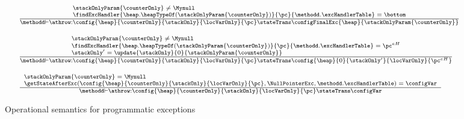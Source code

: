  \begin{figure}[ht!] 
\begin{frameit}
 $$ \begin{array}{l}
 {\scriptsize \frac{ 
	             \begin{array}{l}	 
		           \stackOnlyParam{\counterOnly} \neq \Mynull   \\
			   \findExcHandler{\heap.\heapTypeOf(  \stackOnlyParam{\counterOnly} )  }{\pc}{\methodd.\excHandlerTable} = \bottom 
		     \end{array}	     
	      }
              {\methodd \vdash \athrow :  \config{\heap}{\counterOnly}{\stackOnly}{\locVarOnly}{\pc} 
		                         \stateTrans  
					\configFinalExc{\heap }{\stackOnlyParam{\counterOnly} }} } \\ \\ 
{\scriptsize \frac{ \begin{array}{l}	 
		                \stackOnlyParam{\counterOnly} \neq \Mynull   \\
				\findExcHandler{\heap.\heapTypeOf(  \stackOnlyParam{\counterOnly} )  }{\pc}{\methodd.\excHandlerTable} = \pc^{eH} \\
				\stackOnly' = \update{\stackOnly}{0}{ \stackOnlyParam{\counterOnly} } \\
			    \end{array}	     
	      }
              {\methodd \vdash \athrow :  \config{\heap}{\counterOnly}{\stackOnly}{\locVarOnly}{\pc} 
		                          \stateTrans  
					   \config{\heap}{0}{\stackOnly'}{\locVarOnly}{\pc^{eH}}  } } \\ \\ 
 {\scriptsize \frac{ \begin{array}{l}	 
	                     \stackOnlyParam{\counterOnly}  = \Mynull   \\
			     \getStateAfterExc( \config{\heap}{\counterOnly}{\stackOnly}{\locVarOnly}{\pc}, \NullPointerExc  ,\methodd.\excHandlerTable ) =  \configVar
      		    \end{array}	     
	      }
              {\methodd \vdash \athrow :  \config{\heap}{\counterOnly}{\stackOnly}{\locVarOnly}{\pc} 
		                         \stateTrans  
					  \configVar} } 	   
\end{array}$$
\caption{\sc Operational semantics for programmatic exceptions }
\label{opSem:obj:throw}
\end{frameit}
\end{figure}

